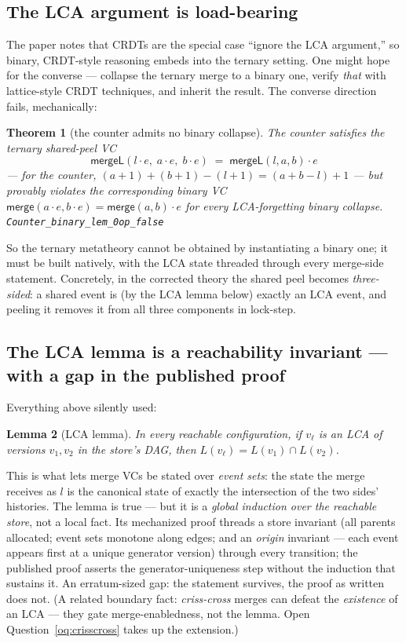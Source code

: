 \documentclass[11pt]{article}
\newtheorem{theorem}{Theorem}[section]
\newtheorem{lemma}[theorem]{Lemma}
\newcommand{\Merge}{\mathsf{merge}}
\newcommand{\mergeL}{\mathsf{mergeL}}
\newcommand{\lean}[1]{\texttt{#1}}
\begin{document}
\subsection{The LCA argument is load-bearing}
\label{sec:loadbearing}

The paper notes that CRDTs are the special case ``ignore the LCA
argument,'' so binary, CRDT-style reasoning embeds into the ternary
setting. One might hope for the converse --- collapse the ternary merge
to a binary one, verify \emph{that} with lattice-style CRDT techniques,
and inherit the result. The converse direction fails, mechanically:

\begin{theorem}[the counter admits no binary collapse]
\label{thm:counter-sep}
The counter satisfies the ternary shared-peel VC
\[
  \mergeL(l \cdot e,\; a \cdot e,\; b \cdot e)
  \;=\; \mergeL(l,a,b) \cdot e
\]
--- for the counter, $(a{+}1)+(b{+}1)-(l{+}1) = (a{+}b{-}l)+1$ ---
but provably violates the corresponding binary VC
$\Merge(a \cdot e, b \cdot e) = \Merge(a,b) \cdot e$ for every
LCA-forgetting binary collapse.
\unskip\nobreak\hspace*{\fill}\lean{Counter\_binary\_lem\_0op\_false}
\end{theorem}

So the ternary metatheory cannot be obtained by instantiating a binary one;
it must be built natively, with the LCA state threaded through every
merge-side statement. Concretely, in the corrected theory the shared peel
becomes \emph{three-sided}: a shared event is (by the LCA lemma below)
exactly an LCA event, and peeling it removes it from all three components
in lock-step.

\subsection{The LCA lemma is a reachability invariant --- with a gap in the
published proof}
\label{sec:lca}

Everything above silently used:

\begin{lemma}[LCA lemma]
\label{lem:lca}
In every reachable configuration, if $v_\ell$ is an LCA of versions $v_1,
v_2$ in the store's DAG, then $L(v_\ell) = L(v_1) \cap L(v_2)$.
\end{lemma}

This is what lets merge VCs be stated over \emph{event sets}: the state
the merge receives as $l$ is the canonical state of exactly the
intersection of the two sides' histories. The lemma is true --- but it is
a \emph{global induction over the reachable store}, not a local fact. Its
mechanized proof threads a store invariant (all parents allocated; event
sets monotone along edges; and an \emph{origin} invariant --- each event
appears first at a unique generator version) through every transition; the
published proof asserts the generator-uniqueness step without the
induction that sustains it. An erratum-sized gap: the statement survives,
the proof as written does not. (A related boundary fact:
\emph{criss-cross} merges can defeat the \emph{existence} of an
LCA --- they gate merge-enabledness, not the lemma. Open
Question~\ref{oq:crisscross} takes up the extension.)
\end{document}

